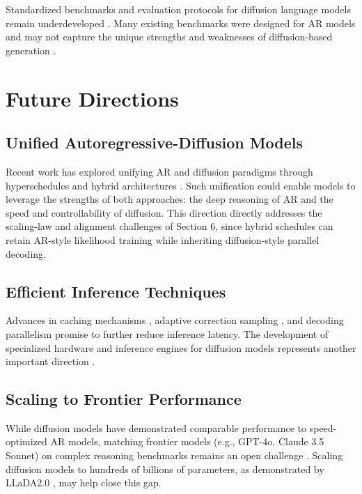 \documentclass[11pt]{article}
\begin{document}
Standardized benchmarks and evaluation protocols for diffusion language models remain underdeveloped \cite{tseng2025diffusion}. Many existing benchmarks were designed for AR models and may not capture the unique strengths and weaknesses of diffusion-based generation \cite{yu2025discrete}.

\section{Future Directions}

\subsection{Unified Autoregressive-Diffusion Models}

Recent work has explored unifying AR and diffusion paradigms through hyperschedules and hybrid architectures \cite{tseng2025diffusion}. Such unification could enable models to leverage the strengths of both approaches: the deep reasoning of AR and the speed and controllability of diffusion. This direction directly addresses the scaling-law and alignment challenges of Section 6, since hybrid schedules can retain AR-style likelihood training while inheriting diffusion-style parallel decoding.

\subsection{Efficient Inference Techniques}

Advances in caching mechanisms \cite{wu2025fastdllm}, adaptive correction sampling \cite{tseng2025diffusion}, and decoding parallelism \cite{li2025surveydlm} promise to further reduce inference latency. The development of specialized hardware and inference engines for diffusion models represents another important direction \cite{khanna2025mercury}.

\subsection{Scaling to Frontier Performance}

While diffusion models have demonstrated comparable performance to speed-optimized AR models, matching frontier models (e.g., GPT-4o, Claude 3.5 Sonnet) on complex reasoning benchmarks remains an open challenge \cite{khanna2025mercury}. Scaling diffusion models to hundreds of billions of parameters, as demonstrated by LLaDA2.0 \cite{nie2025large}, may help close this gap.
\end{document}
